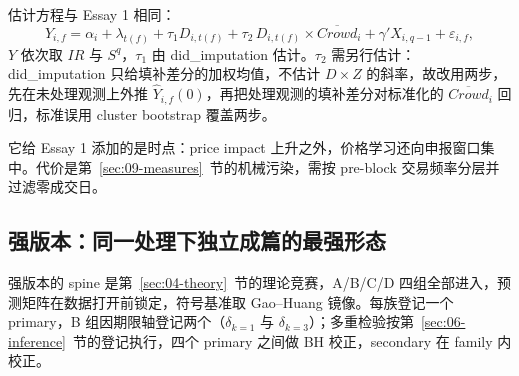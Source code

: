 \documentclass[a4paper,11pt]{ctexart}
\begin{document}
估计方程与 Essay 1 相同：
\begin{equation}\label{eq:11-min}
Y_{i,f}=\alpha_i+\lambda_{t(f)}+\tau_1 D_{i,t(f)}+\tau_2\, D_{i,t(f)}\times \overline{Crowd}_i+\gamma' X_{i,q-1}+\varepsilon_{i,f},
\end{equation}
$Y$ 依次取 $IR$ 与 $S^{q}$，$\tau_1$ 由 did\_imputation 估计。$\tau_2$ 需另行估计：did\_imputation 只给填补差分的加权均值，不估计 $D\times Z$ 的斜率，故改用两步，先在未处理观测上外推 $\hat Y_{i,f}(0)$，再把处理观测的填补差分对标准化的 $\overline{Crowd}_i$ 回归，标准误用 cluster bootstrap 覆盖两步\citep{borusyakjaravelspiess2024}。

它给 Essay 1 添加的是时点：price impact 上升之外，价格学习还向申报窗口集中\citep{kyle1985}。代价是第~\ref{sec:09-measures}~节的机械污染，需按 pre-block 交易频率分层并过滤零成交日。

\subsection{强版本：同一处理下独立成篇的最强形态}\label{sec:11-strong}

强版本的 spine 是第~\ref{sec:04-theory}~节的理论竞赛，A/B/C/D 四组全部进入，预测矩阵在数据打开前锁定，符号基准取 Gao--Huang 镜像\citep{gaohuang2020}。每族登记一个 primary，B 组因期限轴登记两个（$\delta_{k=1}$ 与 $\delta_{k=3}$）；多重检验按第~\ref{sec:06-inference}~节的登记执行，四个 primary 之间做 BH 校正，secondary 在 family 内校正。
\end{document}
